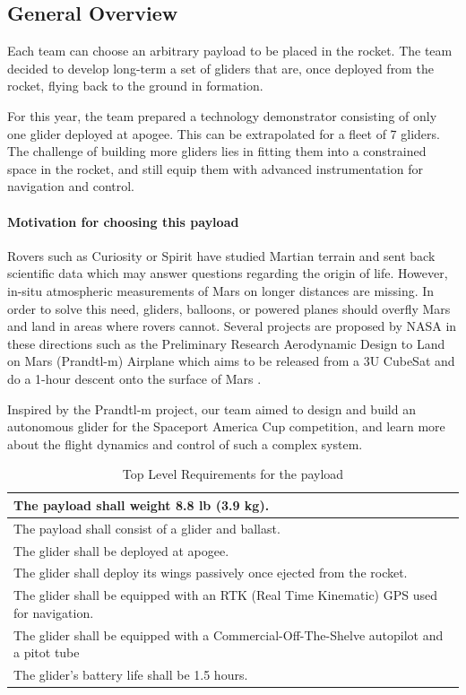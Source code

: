 \subsection{General Overview}

Each team can choose an arbitrary payload to be placed in the rocket. The team decided to develop long-term a set of gliders that are, once deployed from the rocket, flying back to the ground in formation.

For this year, the team prepared a technology demonstrator consisting of only one glider deployed at apogee. This can be extrapolated for a fleet of 7 gliders. The challenge of building more gliders lies in fitting them into a constrained space in the rocket, and still equip them with advanced instrumentation for navigation and control.

\paragraph{Motivation for choosing this payload}
\hfill \break
Rovers such as Curiosity or Spirit have studied Martian terrain and sent back scientific data which may answer questions regarding the origin of life. However, in-situ atmospheric measurements of Mars on longer distances are missing. In order to solve this need, gliders, balloons, or powered planes should overfly Mars and land in areas where rovers cannot. Several projects are proposed by NASA in these directions such as the Preliminary Research Aerodynamic Design to Land on Mars (Prandtl-m) Airplane which aims to be released from a 3U CubeSat and do a 1-hour descent onto the surface of Mars \cite{mars}.

Inspired by the Prandtl-m project, our team aimed to design and build an autonomous glider for the Spaceport America Cup competition, and learn more about the flight dynamics and control of such a complex system.

\begin{table}[h!]
\centering
\begin{tabular}{|p{}|}
\hline
    The payload shall weight 8.8 lb (3.9 kg). \\ \hline
    The payload shall consist of a glider and ballast.  \\ \hline
    The glider shall be deployed at apogee. \\ \hline
    The glider shall deploy its wings passively once ejected from the rocket. \\ \hline
    The glider shall be equipped with an RTK (Real Time Kinematic) GPS used for navigation. \\ \hline
    The glider shall be equipped with a Commercial-Off-The-Shelve autopilot and a pitot tube \\ \hline
    The glider's battery life shall be 1.5 hours. \\ \hline
\end{tabular}
\caption{Top Level Requirements for the payload}
\label{table:se_topLevelR}
\end{table}


